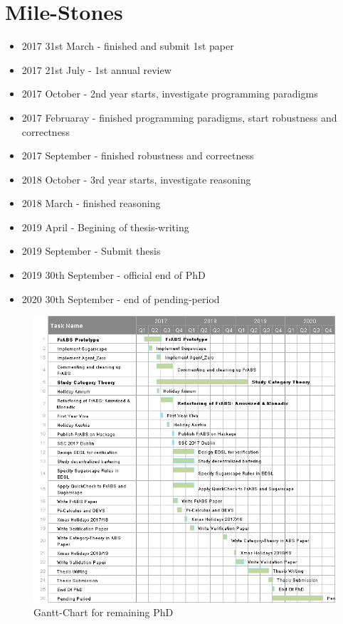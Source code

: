 \section{Mile-Stones}
\begin{itemize}
	\item 2017 31st March - finished and submit 1st paper 
	\item 2017 21st July - 1st annual review
	\item 2017 October - 2nd year starts, investigate programming paradigms
	\item 2017 Februaray - finished programming paradigms, start robustness and correctness
	\item 2017 September - finished robustness and correctness
	\item 2018 October - 3rd year starts, investigate reasoning
	\item 2018 March - finished reasoning
	\item 2019 April - Begining of thesis-writing
	\item 2019 September - Submit thesis
	\item 2019 30th September - official end of PhD
	\item 2020 30th September - end of pending-period
\end{itemize}

\label{app:gantt}
\begin{landscape}
	\begin{figure}
		\label{fig:gantt}
  		\caption{Gantt-Chart for remaining PhD}
  		\centering
  		\includegraphics[width=1.2\textwidth]{./charts/gantt.png}
	\end{figure}
\end{landscape}